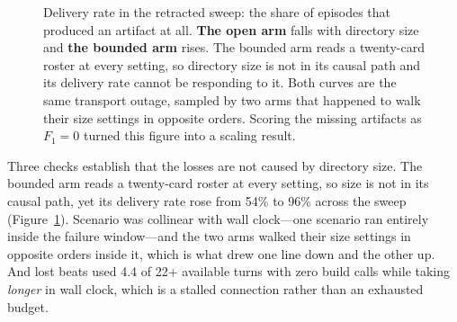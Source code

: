 \begin{figure}[t]
\centering
{}
\caption{Delivery rate in the retracted sweep: the share of episodes that produced an
artifact at all. \textcolor{openarm}{\textbf{The open arm}} falls with directory size and
\textcolor{bndarm}{\textbf{the bounded arm}} rises. The bounded arm reads a twenty-card
roster at every setting, so directory size is not in its causal path and its delivery rate
cannot be responding to it. Both curves are the same transport outage, sampled by two arms
that happened to walk their size settings in opposite orders. Scoring the missing artifacts
as $F_1 = 0$ turned this figure into a scaling result.}
\label{fig:delivery}
\end{figure}

Three checks establish that the losses are not caused by directory size. The bounded arm
reads a twenty-card roster at every setting, so size is not in its causal path, yet its
delivery rate rose from 54\% to 96\% across the sweep (Figure~\ref{fig:delivery}). Scenario was collinear with wall
clock---one scenario ran entirely inside the failure window---and the two arms walked
their size settings in opposite orders inside it, which is what drew one line down and the
other up. And lost beats used 4.4 of 22+ available turns with zero build calls while
taking \emph{longer} in wall clock, which is a stalled connection rather than an exhausted
budget.

